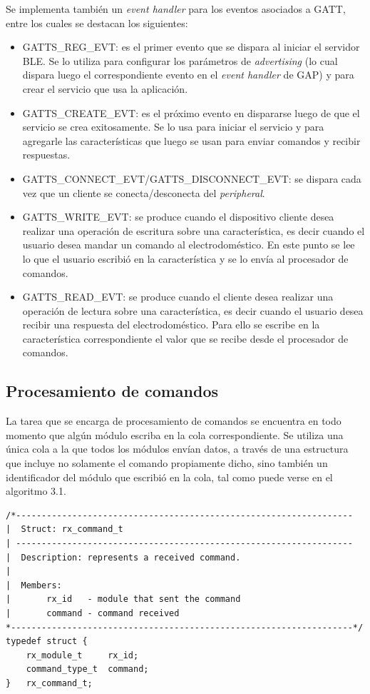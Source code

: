 Se implementa también un \emph{event handler} para los eventos asociados a GATT, entre los cuales se destacan los siguientes:

\begin{itemize}
	\item GATTS\_REG\_EVT: es el primer evento que se dispara al iniciar el servidor BLE. Se lo utiliza para configurar los parámetros de \emph{advertising} (lo cual dispara luego el correspondiente evento en el \emph{event handler} de GAP) y para crear el servicio que usa la aplicación.
	\item GATTS\_CREATE\_EVT: es el próximo evento en dispararse luego de que el servicio se crea exitosamente. Se lo usa para iniciar el servicio y para agregarle las características que luego se usan para enviar comandos y recibir respuestas.
	\item GATTS\_CONNECT\_EVT/GATTS\_DISCONNECT\_EVT: se dispara cada vez que un cliente se conecta/desconecta del \emph{peripheral}.
	\item GATTS\_WRITE\_EVT: se produce cuando el dispositivo cliente desea realizar una operación de escritura sobre una característica, es decir cuando el usuario desea mandar un comando al electrodoméstico. En este punto se lee lo que el usuario escribió en la característica y se lo envía al procesador de comandos.
	\item GATTS\_READ\_EVT: se produce cuando el cliente desea realizar una operación de lectura sobre una característica, es decir cuando el usuario desea recibir una respuesta del electrodoméstico. Para ello se escribe en la característica correspondiente el valor que se recibe desde el procesador de comandos.
\end{itemize}


\subsection{Procesamiento de comandos}

La tarea que se encarga de procesamiento de comandos se encuentra en todo momento que algún módulo escriba en la cola correspondiente. Se utiliza una única cola a la que todos los módulos envían datos, a través de una estructura que incluye no solamente el comando propiamente dicho, sino también un identificador del módulo que escribió en la cola, tal como puede verse en el algoritmo 3.1.

\begin{lstlisting}[label=rx_command_struct:vControl,caption=Pseudocódigo del lazo principal de control.]
/*------------------------------------------------------------------
|  Struct: rx_command_t
| ------------------------------------------------------------------
|  Description: represents a received command.
|
|  Members:
|       rx_id   - module that sent the command
|       command - command received
*-------------------------------------------------------------------*/
typedef struct {
    rx_module_t     rx_id;
    command_type_t  command; 
}   rx_command_t;
\end{lstlisting}

